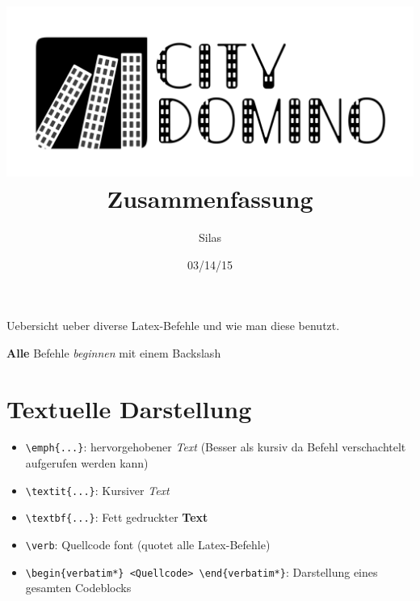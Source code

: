\documentclass[11pt]{report}
\title{\includegraphics[width=.8\linewidth]{pics/LogoIconLarge}\\Zusammenfassung}
\author{Silas}
\date{03/14/15}
\begin{document}
\maketitle
\thispagestyle{empty}

\newpage
\tableofcontents
\newpage

Uebersicht ueber diverse Latex-Befehle und wie man diese benutzt.

\textbf{Alle} Befehle \emph{beginnen} mit einem Backslash

\section{Textuelle Darstellung}
\begin{itemize}
  \item \verb|\emph{...}|: hervorgehobener \emph{Text} (Besser als kursiv da Befehl verschachtelt aufgerufen werden kann)
  \item \verb|\textit{...}|: Kursiver \textit{Text}
  \item \verb|\textbf{...}|: Fett gedruckter \textbf{Text}
  \item \verb|\verb|: Quellcode font (quotet alle Latex-Befehle)
  \item \verb|\begin{verbatim*} <Quellcode> \end{verbatim*}|: Darstellung eines gesamten Codeblocks
\end{itemize}
\end{document}
